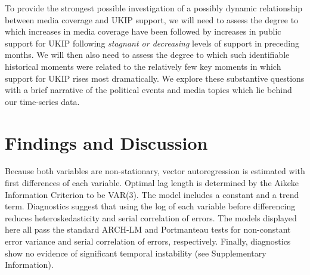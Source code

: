 \documentclass[12pt,]{article}
\begin{document}
To provide the strongest possible investigation of a possibly dynamic
relationship between media coverage and UKIP support, we will need to
assess the degree to which increases in media coverage have been
followed by increases in public support for UKIP following
\emph{stagnant or decreasing} levels of support in preceding months. We
will then also need to assess the degree to which such identifiable
historical moments were related to the relatively few key moments in
which support for UKIP rises most dramatically. We explore these
substantive questions with a brief narrative of the political events and
media topics which lie behind our time-series data.

\section{Findings and Discussion}\label{findings-and-discussion}

Because both variables are non-stationary, vector autoregression is
estimated with first differences of each variable. Optimal lag length is
determined by the Aikeke Information Criterion to be VAR(3). The model
includes a constant and a trend term. Diagnostics suggest that using the
log of each variable before differencing reduces heteroskedasticity and
serial correlation of errors. The models displayed here all pass the
standard ARCH-LM and Portmanteau tests for non-constant error variance
and serial correlation of errors, respectively. Finally, diagnostics
show no evidence of significant temporal instability (see Supplementary
Information).
\end{document}
